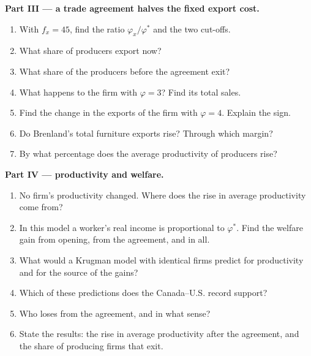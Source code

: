 \begin{problem}
\medskip\noindent\textbf{Part III --- a trade agreement halves the fixed export cost.}
\begin{enumerate}[resume]
\item With $f_x = 45$, find the ratio $\varphi_x/\varphi^*$ and the two cut-offs.
\item What share of producers export now?
\item What share of the producers before the agreement exit?
\item What happens to the firm with $\varphi = 3$? Find its total sales.
\item Find the change in the exports of the firm with $\varphi = 4$. Explain the sign.
\item Do Brenland's total furniture exports rise? Through which margin?
\item By what percentage does the average productivity of producers rise?
\end{enumerate}

\medskip\noindent\textbf{Part IV --- productivity and welfare.}
\begin{enumerate}[resume]
\item No firm's productivity changed. Where does the rise in average productivity
come from?
\item In this model a worker's real income is proportional to $\varphi^*$. Find the
welfare gain from opening, from the agreement, and in all.
\item What would a Krugman model with identical firms predict for productivity and
for the source of the gains?
\item Which of these predictions does the Canada--U.S. record support?
\item Who loses from the agreement, and in what sense?
\item State the results: the rise in average productivity after the agreement,
and the share of producing firms that exit.
\end{enumerate}
\end{problem}
